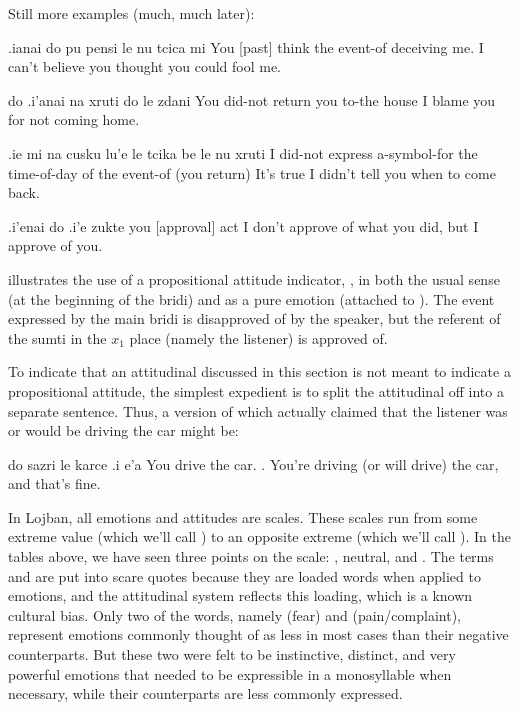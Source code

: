 Still more examples (much, much later):
\begin{example}
.ianai do pu pensi le nu tcica mi\n
{} You [past] think the event-of deceiving me.\n
I can't believe you thought you could fool me.
\end{example}

\begin{example}
do .i'anai na xruti do le zdani\n
You  did-not return you to-the house\n
I blame you for not coming home.
\end{example}

\begin{example}
.ie mi na cusku\n
\T	lu'e le tcika\n
\T	be le nu xruti\n
{} I did-not express\n
\T	a-symbol-for the time-of-day\n
\T	of the event-of (you return)\n
It's true I didn't tell you when to come back.
\end{example}

\begin{example}
.i'enai do .i'e zukte\n
{} you [approval] act\n
I don't approve of what you did, but I approve of you.
\end{example}

 illustrates the use of a
    propositional attitude indicator, , in both the usual
    sense (at the beginning of the bridi) and as a pure emotion
    (attached to ). The event expressed by the main bridi is
    disapproved of by the speaker, but the referent of the sumti in
    the $x_1$ place (namely the listener) is approved of. 

To indicate that an attitudinal discussed in this section is
    not meant to indicate a propositional attitude, the simplest
    expedient is to split the attitudinal off into a separate
    sentence. Thus, a version of 
    which actually claimed that the listener was or would be
    driving the car might be:
\begin{example}
do sazri le karce .i e'a\n
You drive the car.  .\n
You're driving (or will drive) the car,\n
\T	and that's fine.
\end{example}



In Lojban, all emotions and attitudes are scales. These
    scales run from some extreme value (which we'll call
    ) to an opposite extreme (which we'll call
    ). In the tables above, we have seen three points
    on the scale: , neutral, and . The
    terms  and  are put into scare quotes
    because they are loaded words when applied to emotions, and the
    attitudinal system reflects this loading, which is a known
    cultural bias. Only two of the  words, namely
     (fear) and  (pain/complaint), represent emotions
    commonly thought of as less  in most cases than
    their negative counterparts. But these two were felt to be
    instinctive, distinct, and very powerful emotions that needed
    to be expressible in a monosyllable when necessary, while their
    counterparts are less commonly expressed.


